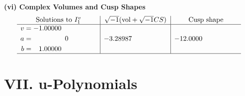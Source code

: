 \documentclass[1p]{elsarticle_modified}
\theoremstyle{definition}
\newcommand{\I}{\sqrt{-1}}
\begin{document}
\newpage\flushleft \textbf{(vi) Complex Volumes and Cusp Shapes}
$$\begin{array}{c|c|c}  
\text{Solutions to }I^v_{1}& \I (\text{vol} + \sqrt{-1}CS) & \text{Cusp shape}\\
 \hline 
\begin{aligned}
v &= -1.00000\phantom{ +0.000000I} \\
a &= \phantom{-0.000000 } 0 \\
b &= \phantom{-}1.00000\phantom{ +0.000000I}\end{aligned}
 & -3.28987\phantom{ +0.000000I} & -12.0000\phantom{ +0.000000I}\\
 \hline 
 \end{array}$$\newpage
\newpage\renewcommand{\arraystretch}{1}
\centering \section*{ VII. u-Polynomials}
\end{document}

